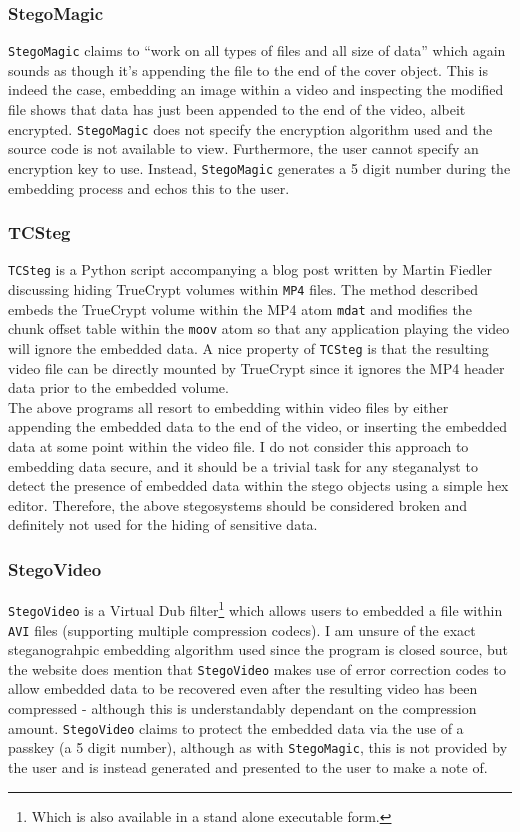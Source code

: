 \documentclass[paper=a4, fontsize=11pt,twoside]{scrartcl}    %
\numberwithin{table}{section}
\numberwithin{figure}{section}
\begin{document}
\subsubsection{StegoMagic}

\texttt{StegoMagic} claims to ``work on all types of files and all size of data'' which again sounds as though it's appending the file to the end of the cover object. This is indeed the case, embedding an image within a video and inspecting the modified file shows that data has just been appended to the end of the video, albeit encrypted. \texttt{StegoMagic} does not specify the encryption algorithm used and the source code is not available to view. Furthermore, the user cannot specify an encryption key to use. Instead, \texttt{StegoMagic} generates a 5 digit number during the embedding process and echos this to the user.  

\subsubsection{TCSteg}

\texttt{TCSteg} is a Python script accompanying a blog post written by Martin Fiedler discussing hiding TrueCrypt volumes within \texttt{MP4} files. The method described embeds the TrueCrypt volume within the MP4 atom \texttt{mdat} and modifies the chunk offset table within the \texttt{moov} atom so that any application playing the video will ignore the embedded data. A nice property of \texttt{TCSteg} is that the resulting video file can be directly mounted by TrueCrypt since it ignores the MP4 header data prior to the embedded volume.\\

\noindent
The above programs all resort to embedding within video files by either appending the embedded data to the end of the video, or inserting the embedded data at some point within the video file. I do not consider this approach to embedding data secure, and it should be a trivial task for any steganalyst to detect the presence of embedded data within the stego objects using a simple hex editor. Therefore, the above stegosystems should be considered broken and definitely not used for the hiding of sensitive data.

\subsubsection{StegoVideo}

\texttt{StegoVideo} is a Virtual Dub filter\footnote{Which is also available in a stand alone executable form.} which allows users to embedded a file within \texttt{AVI} files (supporting multiple compression codecs). I am unsure of the exact steganograhpic embedding algorithm used since the program is closed source, but the website does mention that \texttt{StegoVideo} makes use of error correction codes to allow embedded data to be recovered even after the resulting video has been compressed - although this is understandably dependant on the compression amount. \texttt{StegoVideo} claims to protect the embedded data via the use of a passkey (a 5 digit number), although as with \texttt{StegoMagic}, this is not provided by the user and is instead generated and presented to the user to make a note of.
\end{document}
